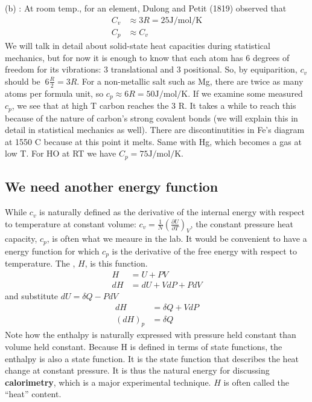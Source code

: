 \documentclass[12pt]{article}
\begin{document}
(b) : At room temp., for an element, Dulong and Petit (1819) observed that
\begin{align*}
C_v &\approx 3 R = 25 \text{J}/\text{mol}/\text{K}\\
C_p & \approx C_v
\end{align*}
We will talk in detail about solid-state heat capacities during statistical mechanics, but for now it is enough to know that each atom has 6 degrees of freedom for its vibrations: 3 translational and 3 positional. So, by equiparition, $c_v$ should be $~6 \frac{R}{2}=3R$. For a non-metallic salt such as Mg, there are twice as many atoms per formula unit, so $c_p \approx 6 R = 50\text{J}/\text{mol}/\text{K}$.   If we examine some measured  $c_p$, we see that at high T carbon reaches the 3 R.  It takes a while to reach this because of the nature of carbon's strong covalent bonds (we will explain this in detail in statistical mechanics as well).  There are discontinutities in Fe's diagram at 1550 \degree C because at this point it melts.  Same with Hg, which becomes a gas at low T.  For H\2O at RT we have $C_p = 75 \text{J}/\text{mol}/\text{K}$.

\subsection{We need another energy function}
While $c_v$ is naturally defined as the derivative of the internal energy with respect to temperature at constant volume: $c_v = \frac{1}{N} \left(\frac{\partial U}{\partial T}\right)_V$, the constant pressure heat capacity, $c_p$, is often what we meaure in the lab. It would be convenient to have a energy function for which $c_p$ is the derivative of the free energy with respect to temperature. The , $H$, is this function.
\begin{align*}
H &= U + PV\\
dH &= dU + V dP + P dV
\end{align*}
and substitute $dU = \delta Q - P dV$
\begin{align*}
dH &= \delta Q + V dP\\
(dH)_p &= \delta Q
\end{align*}
Note how the enthalpy is naturally expressed with pressure held constant than volume held constant. Because H is defined in terms of state functions, the enthalpy is also a state function. It is the state function that describes the heat change at constant pressure.  It is thus the natural energy for discussing \textbf{calorimetry}, which is a major experimental technique.  $H$ is often called the ``heat'' content.\\
\end{document}
